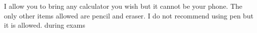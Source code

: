 I allow you to bring any calculator you wish but it cannot be your phone. The only other items allowed are pencil and eraser. I do not recommend using pen but it is allowed.  during exams 